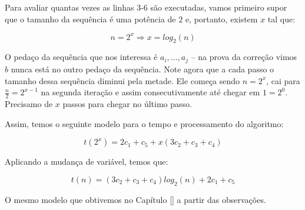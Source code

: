 Para avaliar quantas vezes as linhas 3-6 são executadas, vamos primeiro supor que o tamanho da sequência é uma potência de $2$ e, portanto, existem $x$ tal que:

\begin{displaymath}
  n = 2^x \Rightarrow x = log_2(n)
\end{displaymath}

O pedaço da sequência que nos interessa é $a_i, \dots, a_j$ -- na prova da correção vimos $b$ nunca está no outro pedaço da sequência.
Note agora que a cada passo o tamanho dessa sequência diminui pela metade.
Ele começa sendo $n = 2^x$, cai para $\frac{n}{2} = 2^{x-1}$ na segunda iteração e assim consecutivamente até chegar em $1 = 2^0$.
Precisamo de $x$ passos para chegar no último passo.

Assim, temos o seguinte modelo para o tempo e processamento do algoritmo:

\begin{displaymath}
  t(2^x) = 2c_1 + c_5 + x(3c_2 + c_3 + c_4)
\end{displaymath}

Aplicando a mudança de variável, temos que:

\begin{displaymath}
  t(n) = (3c_2 + c_3 + c_4)log_2(n) + 2c_1 + c_5
\end{displaymath}

O mesmo modelo que obtivemos no Capítulo \ref{} a partir das observações.
